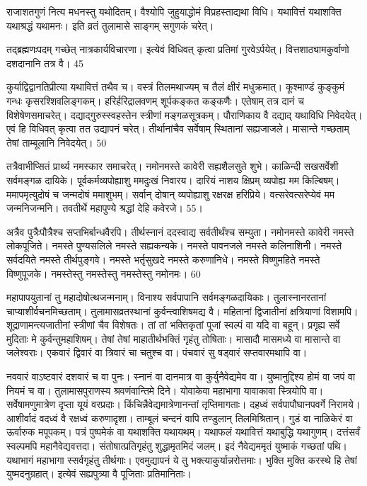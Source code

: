   राजाशतगुणं नित्य मधनस्तु यथोदितम्।
 वैश्योपि जुहुयाद्धोमं विप्रहस्ताद्यथा विधि।
 यथावित्तं यथाशक्ति यथाश्रद्धं यथामनः।
 इति व्रतं तुलामासे साङ्गम् सगुणकं चरेत्।
 
तद्ब्रह्मणःपदम् गच्छेत् नात्रकार्यविचारणा।
 इत्येवं विधिवत् कृत्वा प्रतिमां गुरवेऽर्पयेत्।
 वित्तशाठ्यामकुर्वाणो दशदानानि तत्र वै।
 45

  कुर्याद्विद्वानतिप्रीत्या यथावित्तं तथैव च।
 वस्त्रं तिलमथाज्यम् च तैलं क्षीरं मधुक्रमात्।
 कूश्माण्डं कुङ्कुमं गन्धः कृसरश्शिवलिङ्गकम्।
 हरिर्हरिद्रालवणम् शूर्पकङ्कत कङ्कणैः।
 एतेषाम् तत्र दानं च विशेषेणसमाचरेत्।
 दद्याद्गुरुस्स्वहस्तेन स्त्रीणां मङ्गळसूत्रकम्।
 पौराणिकाय वै दद्याद् यथाविधि निवेदयेत्।
 एवं हि विधिवत् कृत्वा तत उद्यापनं चरेत्।
 तीर्थानांचैव सर्वेषाम् स्थितानां सह्यजाजले।
 मासान्ते गच्छताम् तेषां ताम्बूलानि निवेदयेत्।
 50

  तत्रैवाभीप्सितं प्रार्थ्य नमस्कार समाचरेत्।
 नमोनमस्ते कावेरी सह्यशैलसुते शुभे।
 काळिन्दी सखसर्वेशी सर्वमङ्गळ दायिके।
 पूर्वकर्मव्यपोह्याशु ममदुःखं निवारय।
 दारियं नाशय क्षिप्रम् व्यपोह्य मम किल्बिषम्।
 ममापमृत्युदोषं च जन्मदोषं ममाशुभम्।
 सर्वान् दोषान् व्यपोह्याशु रक्षरक्ष हरिप्रिये।
 वत्सरेवत्सरेप्येवं मम जन्मनिजन्मनि।
 तवतीर्थे महापुण्ये श्रद्धां देहि कवेरजे।
 55।

 

अत्रैव पुत्रैःपौत्रैश्च सप्तभिर्बान्धवैरपि।
 तीर्थस्नानं ददस्वाद्य सर्वतीर्थंश्च सम्युता।
 नमोनमस्ते कावेरी नमस्ते लोकपूजिते।
 नमस्ते पुण्यसलिले नमस्ते सह्यकन्यके।
 नमस्ते पावनजले नमस्ते कलिनाशिनी।
 नमस्ते सर्वदयिते नमस्ते तीर्थपुङ्गवे।
 नमस्ते भर्तृसुखदे नमस्ते करुणानिधे।
 नमस्ते विष्णुमहिते नमस्ते विष्णुपूजके।
 नमस्तेस्तु नमस्तेस्तु नमस्तेस्तु नमोनमः।
 60

  महापापयुतानां तु महादोषोत्थजन्मनाम्।
 विनाश्य सर्वपापानि सर्वमङ्गळदायिकाः।
 तुलास्नानरतानां चाप्याशीर्वचनमिच्छताम्।
 तुलामासव्रतस्थानां कुर्वन्त्वाशिषमद्य वै।
 महितानां द्विजातीनां क्षत्रियाणां विशामपि।
 शूद्राणामन्त्यजातीनां स्त्रीणां चैव विशेषतः।
 तां तां भक्तिकृतां पूजां स्वल्पं वा यदि वा बहून्।
 प्रगृह्य सर्वे मुदिताः मे कुर्वन्तुमहाशिषम्।
 तेषां तेषां माहातीर्थभक्तिं गृहंतु तोषिताः।
 मासादौ मासमध्ये वा मासान्ते वा जलेश्वराः।
 एकवारं द्विवारं वा त्रिवारं चा चतुश्च वा।
 पंचवारं सु षड्वारं सप्तवारमथापि वा।
 
नववारं वाऽष्टवारं दशवारं च वा पुनः।
 स्नानं वा दानमात्र वा कुर्युनैवेद्यमेव वा।
 युष्मानुद्दिश्य होमं वा जपं वा नियमं च वा।
 तुलामासपुराणस्य श्रवणंवान्तिमे दिने।
 योवाकेवा महाभागा यावाकावा स्त्रियोपि वा।
 सर्वेषामणुमात्रेण दृप्ता यूयं वरप्रदाः।
 किंचिन्नैवेद्यमात्रेणानन्तां तृप्तिमागताः।
 दहध्वं सर्वपापौघानपवर्गे निरामये।
 आशीर्वादं वदध्वं वै रक्षध्वं करुणादृशा।
 ताम्बूलं चन्दनं वापि तण्डुलान् तिलमिश्रितान्।
 गुडं वा नाळिकेरं वा ऊर्वारुक मपूपकम्।
 पत्रं पुष्पमेकं वा यथाशक्ति यथायथम्।
 यथाफलं यथावित्तं यथाबुद्धि यथागुणम्।
 दत्तंसर्वं स्वल्पमपि महानैवेद्यवत्तदा।
 संतोषात्प्रतिगृहंतु शुद्धामृतमिदं जलम्।
 इदं नैवेद्यममृतं युष्माकं गच्छतां पथि।
 यथाभागं महाभागा स्सर्वगृहंतु तीर्थगाः।
 एवमुद्यापनं ये तु भक्त्याकुर्यान्नरोत्तमाः।
 भुक्ति मुक्ति करस्थे हि तेषां युष्मदनुग्रहात्।
 इत्येवं सह्यपुत्र्या वै पूजिताः प्रतिमानिताः।
 

